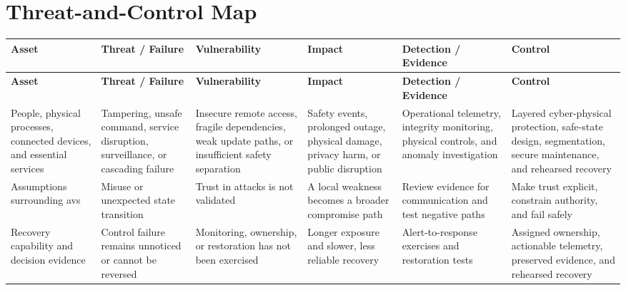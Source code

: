 \documentclass[11pt]{article}
\begin{document}
\section*{Threat-and-Control Map}
\begingroup\scriptsize\setlength{\tabcolsep}{2pt}
\begin{longtable}{>{\RaggedRight\arraybackslash}p{}>{\RaggedRight\arraybackslash}p{}>{\RaggedRight\arraybackslash}p{}>{\RaggedRight\arraybackslash}p{}>{\RaggedRight\arraybackslash}p{}>{\RaggedRight\arraybackslash}p{}}
\toprule\rowcolor{Navy}\color{white}\textbf{Asset} & \color{white}\textbf{Threat / Failure} & \color{white}\textbf{Vulnerability} & \color{white}\textbf{Impact} & \color{white}\textbf{Detection / Evidence} & \color{white}\textbf{Control}\\\midrule
\endfirsthead
\toprule\rowcolor{Navy}\color{white}\textbf{Asset} & \color{white}\textbf{Threat / Failure} & \color{white}\textbf{Vulnerability} & \color{white}\textbf{Impact} & \color{white}\textbf{Detection / Evidence} & \color{white}\textbf{Control}\\\midrule
\endhead
People, physical processes, connected devices, and essential services & Tampering, unsafe command, service disruption, surveillance, or cascading failure & Insecure remote access, fragile dependencies, weak update paths, or insufficient safety separation & Safety events, prolonged outage, physical damage, privacy harm, or public disruption & Operational telemetry, integrity monitoring, physical controls, and anomaly investigation & Layered cyber-physical protection, safe-state design, segmentation, secure maintenance, and rehearsed recovery\\\midrule
Assumptions surrounding avs & Misuse or unexpected state transition & Trust in attacks is not validated & A local weakness becomes a broader compromise path & Review evidence for communication and test negative paths & Make trust explicit, constrain authority, and fail safely\\\midrule
Recovery capability and decision evidence & Control failure remains unnoticed or cannot be reversed & Monitoring, ownership, or restoration has not been exercised & Longer exposure and slower, less reliable recovery & Alert-to-response exercises and restoration tests & Assigned ownership, actionable telemetry, preserved evidence, and rehearsed recovery\\\midrule
\bottomrule
\end{longtable}
\endgroup
\end{document}

